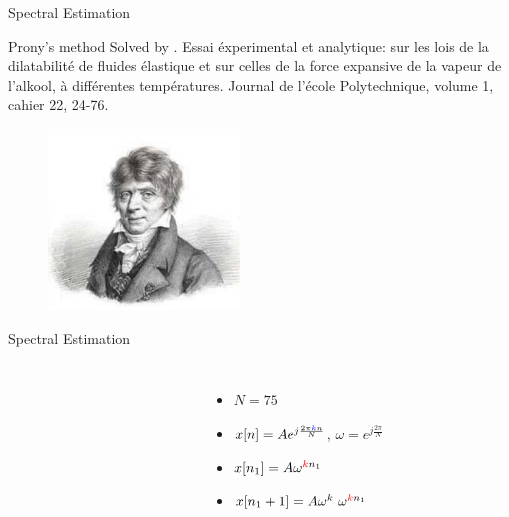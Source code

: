 \documentclass[10pt,xcolor=table]{beamer}
\begin{document}
\begin{frame}{Spectral Estimation}
\begin{block}{Prony's method}
Solved by {\color{blue}{Baron Gaspard Riche de Prony (1795)}}. Essai éxperimental et analytique: sur les lois de la dilatabilité de fluides élastique et sur celles de la force expansive de la vapeur de l'alkool, à différentes températures. Journal de l'école Polytechnique, volume 1, cahier 22, 24-76.
\end{block}
\begin{figure}
  \centering
  \includegraphics[width=2.0in]{Gaspard_de_Prony.pdf}
\end{figure}
\end{frame}
\begin{frame}{Spectral Estimation}
	
	\begin{columns}
		
		\begin{figure}
			\centering
			\scalebox{0.60}{}
		\end{figure}
		
		\begin{figure}
			\centering
			\scalebox{0.60}{}
		\end{figure}

        \begin{itemize}
        \item $N=75$
        \item $x[n] = A e^{j \frac{2 \pi {\color{blue}{k}} n}{N}}$, $\omega = e^{j \frac{2 \pi}{N}}$
        \pause
        \item $x[n_1] = A \omega^{{\color{red}{k}}n_1}$
        \item $x[n_1+1] = A \omega^k \ \omega^{{\color{red}{k}}n_1}$
		\end{itemize}
	\end{columns}	
\end{frame}
\end{document}
